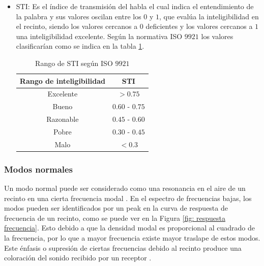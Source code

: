 \begin{itemize}
    
    \item STI: Es el índice de transmisión del habla el cual indica el entendimiento de la palabra y sus valores oscilan entre los $0$ y $1$, que evalúa la inteligibilidad en el recinto, siendo los valores cercanos a 0 deficientes y los valores cercanos a $1$ una inteligibilidad excelente. Según la normativa ISO $9921$ \cite{ISO9921} los valores clasificarían como se indica en la tabla \ref{tab: rango STI}. 

\begin{table}[H]
    \centering
    \caption{Rango de STI según ISO $9921$}
    \label{tab: rango STI}
    \begin{tabular}{|c|c|}
    \hline
    \textbf{Rango de inteligibilidad} & \textbf{STI} \\ \hline
    Excelente                &     $>0.75$     \\ \hline
    Bueno                    & $0.60$ - $0.75$ \\ \hline
    Razonable                & $0.45$ - $0.60$ \\ \hline
    Pobre                    & $0.30$ - $0.45$ \\ \hline
    Malo                     & $<0.3$ \\ \hline
    \end{tabular}
\end{table}
\end{itemize}

\subsubsection{Modos normales}\label{subsecc: modos normales}
Un modo normal puede ser considerado como una resonancia en el aire de un recinto en una cierta frecuencia modal \cite{Kleiner2014-fd}.
En el espectro de frecuencias bajas, los modos pueden ser identificados por un peak en la curva de respuesta de frecuencia de un recinto, como se puede ver en la Figura \ref{fig: respuesta frecuencia}. 
Esto debido a que la densidad modal es proporcional al cuadrado de la frecuencia, por lo que a mayor frecuencia existe mayor traslape de estos modos.
Este énfasis o supresión de ciertas frecuencias debido al recinto produce una coloración del sonido recibido por un receptor \cite{Kuttruff_2017}.

